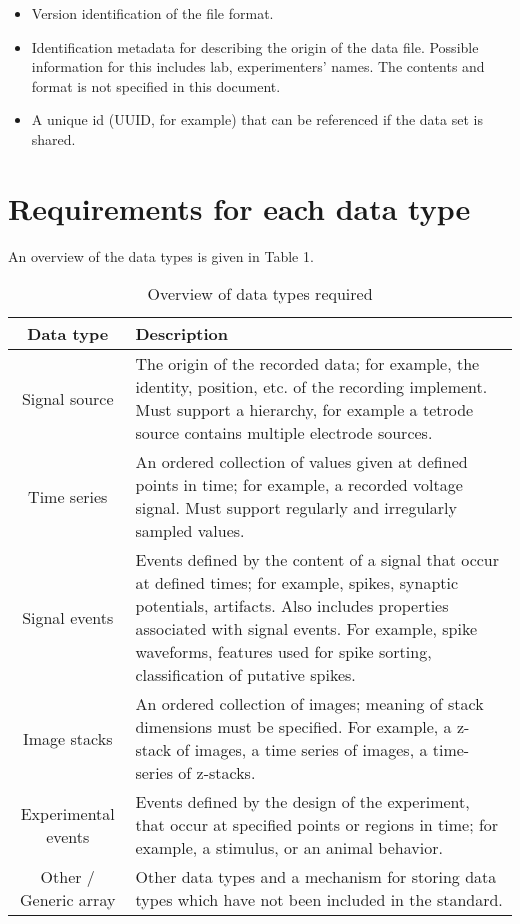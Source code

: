\documentclass[letterpaper, 10 pt, conference]{ieeeconf}  \IEEEoverridecommandlockouts                              \overrideIEEEmargins
\begin{document}
\begin{itemize}
\item Version identification of the  file format.
\item Identification metadata for describing the origin of the data file.   
Possible information for this includes lab, experimenters’ names.  
The contents and format is not specified in this document.
\item A unique id (UUID, for example) that can be referenced if the data set is shared. 
\end{itemize}

\medskip
\section{\textbf{Requirements for each data type}}
An overview of the data types is given in Table 1.
\begin{table*}[t]
\begin{tabular}{ c | p{14.3cm} }
  \hline			
  \textbf{Data type} & \textbf{Description}\\
  \hline
  Signal source & The origin of the recorded data; for example, the identity, position, etc. of the recording implement.  Must support a hierarchy, for example a tetrode source contains multiple electrode sources. \\
  Time series & An ordered collection of values given at defined points in time; for example, a recorded voltage signal.  Must support regularly and irregularly sampled values. \\
  Signal events & Events defined by the content of a signal that occur at defined times; for example, spikes, synaptic potentials, artifacts.  Also includes properties associated with signal events.  For example, spike waveforms, features used for spike sorting, classification of putative spikes. \\
  Image stacks & An ordered collection of images; meaning of stack dimensions must be specified.  For example, a z-stack of images, a time series of images, a time-series of z-stacks. \\
  Experimental events & Events defined by the design of the experiment, that occur at specified points or regions in time; for example, a stimulus, or an animal behavior. \\
  Other / Generic array & Other data types and a mechanism for storing data types which have not been included in the standard. \\
  \hline  
\end{tabular}
\caption{Overview of data types required}
\end{table*}
\end{document}
